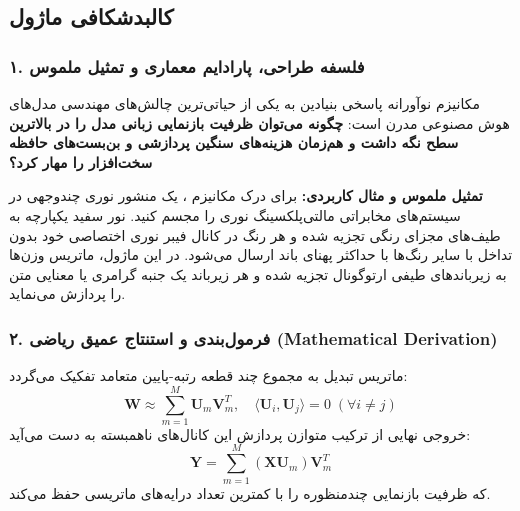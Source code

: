 \subsection{کالبدشکافی ماژول }

\subsubsection*{۱. فلسفه طراحی، پارادایم معماری و تمثیل ملموس}
مکانیزم نوآورانه  پاسخی بنیادین به یکی از حیاتی‌ترین چالش‌های مهندسی مدل‌های هوش مصنوعی مدرن است: \textbf{چگونه می‌توان ظرفیت بازنمایی زبانی مدل را در بالاترین سطح نگه داشت و هم‌زمان هزینه‌های سنگین پردازشی و بن‌بست‌های حافظه سخت‌افزار را مهار کرد؟}

\textbf{تمثیل ملموس و مثال کاربردی:}
برای درک مکانیزم ، یک منشور نوری چندوجهی در سیستم‌های مخابراتی مالتی‌پلکسینگ نوری را مجسم کنید. نور سفید یکپارچه به طیف‌های مجزای رنگی تجزیه شده و هر رنگ در کانال فیبر نوری اختصاصی خود بدون تداخل با سایر رنگ‌ها با حداکثر پهنای باند ارسال می‌شود. در این ماژول، ماتریس وزن‌ها به زیرباندهای طیفی ارتوگونال تجزیه شده و هر زیرباند یک جنبه گرامری یا معنایی متن را پردازش می‌نماید.

\subsubsection*{۲. فرمول‌بندی و استنتاج عمیق ریاضی (Mathematical Derivation)}
ماتریس تبدیل به مجموع چند قطعه رتبه-پایین متعامد تفکیک می‌گردد:
\begin{equation}
\mathbf{W} \approx \sum_{m=1}^M \mathbf{U}_m \mathbf{V}_m^T, \quad \langle \mathbf{U}_i, \mathbf{U}_j \rangle = 0 \; (\forall i \neq j)
\end{equation}
خروجی نهایی از ترکیب متوازن پردازش این کانال‌های ناهمبسته به دست می‌آید:
\begin{equation}
\mathbf{Y} = \sum_{m=1}^M (\mathbf{X} \mathbf{U}_m) \mathbf{V}_m^T
\end{equation}
که ظرفیت بازنمایی چندمنظوره را با کمترین تعداد درایه‌های ماتریسی حفظ می‌کند.

